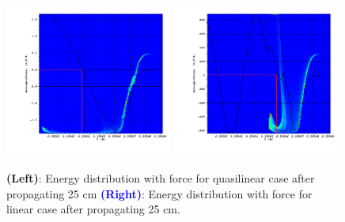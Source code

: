 \documentclass[%
onecolumn, notitlepage,
 amsmath,amssymb,
 aps,
]{article}
\begin{document}
\begin{figure}[!ht]
\centering
\includegraphics[width=0.49\textwidth]{visit0040.png}
\includegraphics[width=0.49\textwidth]{visit0042.png}
\caption{\textcolor{Orange2}{\textbf{(Left)}}{: Energy distribution with force for quasilinear case after propagating 25 cm} \textcolor{blue}{\textbf{(Right)}}{: Energy distribution with force for linear case after propagating 25 cm}.}
\end{figure}
\clearpage
\end{document}
